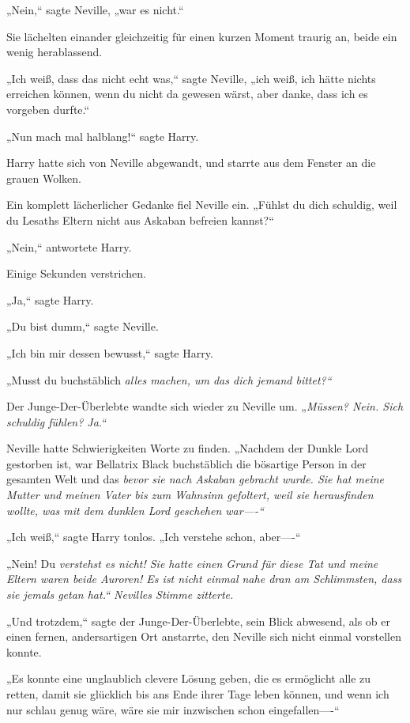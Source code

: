 {„Nein,“ sagte Neville, „war es nicht.“

Sie lächelten einander gleichzeitig für einen kurzen Moment traurig an, beide ein wenig herablassend.

„Ich weiß, dass das nicht echt was,“ sagte Neville, „ich weiß, ich hätte nichts erreichen können, wenn du nicht da gewesen wärst, aber danke, dass ich es vorgeben durfte.“

„Nun mach mal halblang!“ sagte Harry.

Harry hatte sich von Neville abgewandt, und starrte aus dem Fenster an die grauen Wolken.

Ein komplett lächerlicher Gedanke fiel Neville ein. „Fühlst du dich schuldig, weil du Lesaths Eltern nicht aus Askaban befreien kannst?“

„Nein,“ antwortete Harry.

Einige Sekunden verstrichen.

„Ja,“ sagte Harry.

„Du bist dumm,“ sagte Neville.

„Ich bin mir dessen bewusst,“ sagte Harry.

„Musst du buchstäblich \emph{alles machen, um das dich jemand bittet?“}

Der Junge-Der-Überlebte wandte sich wieder zu Neville um. „\emph{Müssen? Nein. Sich schuldig fühlen? Ja.“}

Neville hatte Schwierigkeiten Worte zu finden. „Nachdem der Dunkle Lord gestorben ist, war Bellatrix Black buchstäblich die bösartige Person in der gesamten Welt und das \emph{bevor sie nach Askaban gebracht wurde. Sie hat meine Mutter und meinen Vater bis zum Wahnsinn gefoltert, weil sie herausfinden wollte, was mit dem dunklen Lord geschehen war----“}

„Ich weiß,“ sagte Harry tonlos. „Ich verstehe schon, aber----“

„Nein! Du \emph{verstehst es nicht! Sie hatte einen \emph{Grund} für diese Tat und meine Eltern waren beide Auroren! Es ist nicht einmal \emph{nahe dran} am Schlimmsten, dass sie jemals getan hat.“ Nevilles Stimme zitterte.}

„Und trotzdem,“ sagte der Junge-Der-Überlebte, sein Blick abwesend, als ob er einen fernen, andersartigen Ort anstarrte, den Neville sich nicht einmal vorstellen konnte.

„Es konnte eine unglaublich clevere Lösung geben, die es ermöglicht alle zu retten, damit sie glücklich bis ans Ende ihrer Tage leben können, und wenn ich nur schlau genug wäre, wäre sie mir inzwischen schon eingefallen----“

}
